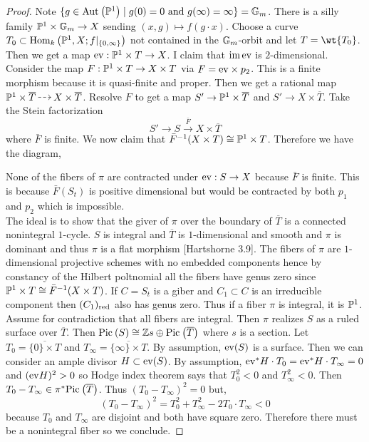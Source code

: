 \documentclass[12pt]{article}
\newcommand{\fixHom}[4]{\mathrm{Hom}_{#1} \left( #2, #3 ; #4 \right)}
\begin{document}
\begin{proof}
Note $\{ g \in \Aut{\P^1} \mid g(0) = 0 \text{ and } g(\infty) = \infty \} = \Gm$. There is a silly family $\P^1 \times \Gm \to X$ sending $(x, g) \mapsto f(g \cdot x)$. Choose a curve $T_0 \subset \fixHom{k}{\P^1}{X}{f|_{\{ 0, \infty \}}}$ not contained in the $\Gm$-orbit and let $T = \wt{T_0}$. Then we get a map $\ev : \P^1 \times T \to X$. I claim that $\im{\ev}$ is $2$-dimensional. Consider the map $F : \P^1 \times T \to X \times T$ via $F = \ev \times p_2$. This is a finite morphism because it is quasi-finite and proper. Then we get a rational map $\P^1 \times \overline{T} \rat X \times \overline{T}$. Resolve $F$ to get a map $S' \to \P^1 \times \overline{T}$ and $S' \to X \times \overline{T}$. Take the Stein factorization 
\[ S' \to S \xrightarrow{\bar{F}} X \times \overline{T} \]
where $\bar{F}$ is finite. We now claim that $\bar{F}^{-1}(X \times T) \cong \P^1 \times T$. Therefore we have the diagram,
\begin{center}
\end{center}
None of the fibers of $\pi$ are contracted under $\ev : S \to X$ because $\bar{F}$ is finite. This is because $\bar{F}(S_t)$ is positive dimensional but would be contracted by both $p_1$ and $p_2$ which is impossible. 
\bigskip\\
The ideal is to show that the giver of $\pi$ over the boundary of $\overline{T}$ is a connected nonintegral $1$-cycle. $S$ is integral and $\overline{T}$ is $1$-dimensional and smooth and $\pi$ is dominant and thus $\pi$ is a flat morphism [Hartshorne 3.9]. The fibers of $\pi$ are $1$-dimensional projective schemes with no embedded components hence by constancy of the Hilbert poltnomial all the fibers have genus zero since $\P^1 \times T \cong \bar{F}^{-1}(X \times T)$. If $C = S_t$ is a giber and $C_1 \subset C$ is an irreducible component then $(C_1)_{\red}$ also has genus zero. Thus if a fiber $\pi$ is integral, it is $\P^1$. Assume for contradiction that all fibers are integral. Then $\pi$ realizes $S$ as a ruled surface over $\overline{T}$. Then $\Pic{S} \cong \Z s \oplus \Pic{\overline{T}}$ where $s$ is a section. Let $T_0 = \overline{ \{ 0 \} \times T }$ and $T_{\infty} = \overline{ \{ \infty \} \times T}$. By assumption, $\ev(S)$ is a surface. Then we can consider an ample divisor $H \subset  \ev(S)$. By assumption, $\ev^* H \cdot T_0 = \ev^* H \cdot T_{\infty} = 0$ and $(\ev H)^2 > 0$ so Hodge index theorem says that $T_0^2 < 0$ and $T_{\infty}^2 < 0$. Then $T_0 - T_\infty \in \pi^* \Pic{\overline{T}}$. Thus $(T_0 - T_\infty)^2 = 0$ but,
\[ (T_0 - T_\infty)^2 = T_0^2 + T_\infty^2 - 2 T_0 \cdot T_\infty < 0 \]
because $T_0$ and $T_\infty$ are disjoint and both have square zero. Therefore there must be a nonintegral fiber so we conclude.
\end{proof}
\end{document}
